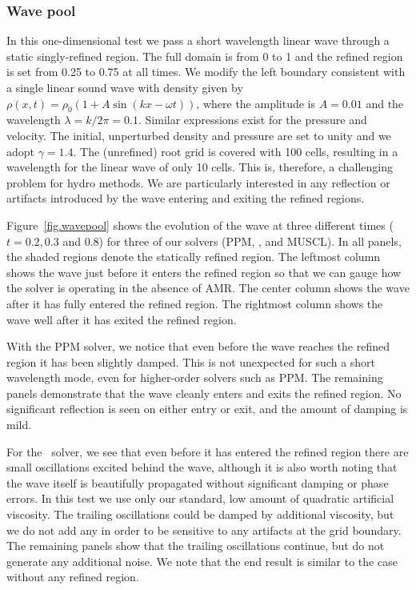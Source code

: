 \subsubsection{Wave pool}
\label{sec.tests.wavepool}

In this one-dimensional test we pass a short wavelength linear wave through a static singly-refined region.  The full domain is from 0 to 1 and the refined region is set from 0.25 to 0.75 at all times.  We modify the left boundary consistent with a single linear sound wave with density given by $\rho(x,t) = \rho_0 (1 + A \sin(kx - \omega t))$, where the amplitude is $A = 0.01$ and the wavelength $\lambda = k/2\pi = 0.1$.  Similar expressions exist for the pressure and velocity.  The initial, unperturbed density and pressure are set to unity and we adopt $\gamma = 1.4$.  The (unrefined) root grid is covered with 100 cells, resulting in a wavelength for the linear wave of only 10 cells.  This is, therefore, a challenging problem for hydro methods.  We are particularly interested in any reflection or artifacts introduced by the wave entering and exiting the refined regions.

Figure~\ref{fig.wavepool} shows the evolution of the wave at three different times ($t = 0.2, 0.3$ and 0.8) for three of our solvers (PPM, \zeus, and MUSCL).  In all panels, the shaded regions denote the statically refined region. The leftmost column shows the wave just before it enters the refined region so that we can gauge how the solver is operating in the absence of AMR.  The center column shows the wave after it has fully entered the refined region.  The rightmost column shows the wave well after it has exited the refined region.

With the PPM solver, we notice that even before the wave reaches the refined region it has been slightly damped. This is not unexpected for such a short wavelength mode, even for higher-order solvers such as PPM.  The remaining panels demonstrate that the wave cleanly enters and exits the refined region.  No significant reflection is seen on either entry or exit, and the amount of damping is mild.

For the \zeus\ solver, we see that even before it has entered the refined region there are small oscillations excited behind the wave, although it is also worth noting that the wave itself is beautifully propagated without significant damping or phase errors.  In this test we use only our standard, low amount of quadratic artificial viscosity.  The trailing oscillations could be damped by additional viscosity, but we do not add any in order to be sensitive to any artifacts at the grid boundary.  The remaining panels show that the trailing oscillations continue, but do not generate any additional noise. We note that the end result is similar to the case without any refined region.

